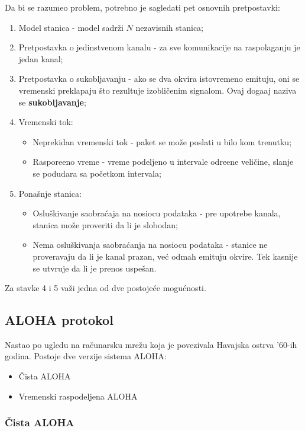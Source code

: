 \documentclass{article} %
\begin{document}
Da bi se razumeo problem, potrebno je sagledati pet osnovnih pretpostavki:
\begin{enumerate}
	\item Model stanica - model sadr\v{z}i $N$ nezavisnih stanica;
	\item Pretpostavka o jedinstvenom kanalu - za sve komunikacije na raspolaganju je jedan kanal;
	\item Pretpostavka o sukobljavanju - ako se dva okvira istovremeno emituju, oni se vremenski preklapaju \v{s}to rezultuje izobli\v{c}enim signalom. Ovaj doga\dj{}aj naziva se \textbf{sukobljavanje};
	\item Vremenski tok:
	\begin{itemize}
		\item Neprekidan vremenski tok - paket se mo\v{z}e poslati u bilo kom trenutku;
		\item Raspore\dj{}eno vreme - vreme podeljeno u intervale odre\dj{}ene veli\v{c}ine, slanje se podudara sa po\v{c}etkom intervala;
	\end{itemize}
	\item Pona\v{s}nje stanica:
	\begin{itemize}
		\item Oslu\v{s}kivanje saobra\'{c}aja na nosiocu podataka - pre upotrebe kanala, stanica mo\v{z}e proveriti da li je slobodan;
		\item Nema oslu\v{s}kivanja saobra\'{c}anja na nosiocu podataka - stanice ne proveravaju da li je kanal prazan, ve\'{c} odmah emituju okvire. Tek kasnije se utvr\dj{}uje da li je prenos uspe\v{s}an.
	\end{itemize}
\end{enumerate}
Za stavke 4 i 5 va\v{z}i jedna od dve postoje\'{c}e mogu\'{c}nosti.

\subsection{ALOHA protokol}

Nastao po ugledu na ra\v{c}unarsku mre\v{z}u koja je povezivala Havajska ostrva '60-ih godina. Postoje dve verzije sistema ALOHA:
\begin{itemize}
	\item \v{C}ista ALOHA
	\item Vremenski raspodeljena ALOHA
\end{itemize}

\subsubsection{\v{C}ista ALOHA}
\end{document}
